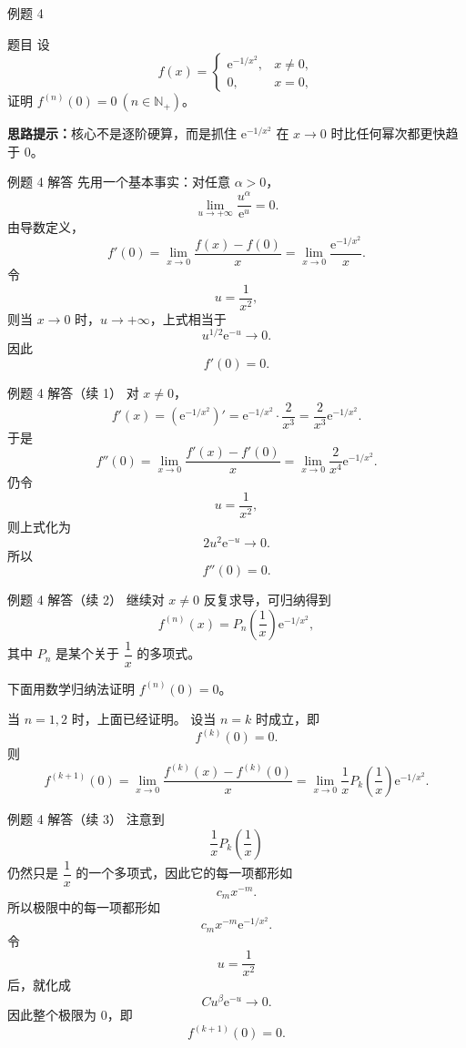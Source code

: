 ﻿\documentclass[aspectratio=169,10pt]{ctexbeamer}
\newcommand{\e}{\mathrm{e}}
\begin{document}
\begin{frame}[t]{例题 4}
\small
\begin{block}{题目}
设
\[
f(x)=
\begin{cases}
\e^{-1/x^2}, & x\ne 0,\\
0, & x=0,
\end{cases}
\]
证明 $f^{(n)}(0)=0\ (n\in\mathbb N_+)$。
\end{block}

\vspace{0.4em}
\textbf{思路提示：}核心不是逐阶硬算，而是抓住 $\e^{-1/x^2}$ 在 $x\to0$ 时比任何幂次都更快趋于 $0$。
\end{frame}

\begin{frame}[t]{例题 4 解答}
\small
先用一个基本事实：对任意 $\alpha>0$，
\[
\lim_{u\to+\infty}\frac{u^\alpha}{\e^u}=0.
\]
由导数定义，
\[
f'(0)=\lim_{x\to0}\frac{f(x)-f(0)}{x}
=\lim_{x\to0}\frac{\e^{-1/x^2}}{x}.
\]
令
\[
u=\frac1{x^2},
\]
则当 $x\to0$ 时，$u\to+\infty$，上式相当于
\[
u^{1/2}\e^{-u}\to0.
\]
因此
\[
f'(0)=0.
\]
\end{frame}

\begin{frame}[t]{例题 4 解答（续 1）}
\small
对 $x\ne0$，
\[
f'(x)=\left(\e^{-1/x^2}\right)'=\e^{-1/x^2}\cdot\frac{2}{x^3}
=\frac{2}{x^3}\e^{-1/x^2}.
\]
于是
\[
f''(0)=\lim_{x\to0}\frac{f'(x)-f'(0)}{x}
=\lim_{x\to0}\frac{2}{x^4}\e^{-1/x^2}.
\]
仍令
\[
u=\frac1{x^2},
\]
则上式化为
\[
2u^2\e^{-u}\to0.
\]
所以
\[
f''(0)=0.
\]
\end{frame}

\begin{frame}[t]{例题 4 解答（续 2）}
\small
继续对 $x\ne0$ 反复求导，可归纳得到
\[
f^{(n)}(x)=P_n\!\left(\frac1x\right)\e^{-1/x^2},
\]
其中 $P_n$ 是某个关于 $\dfrac1x$ 的多项式。

下面用数学归纳法证明 $f^{(n)}(0)=0$。

当 $n=1,2$ 时，上面已经证明。
设当 $n=k$ 时成立，即
\[
f^{(k)}(0)=0.
\]
则
\[
f^{(k+1)}(0)=\lim_{x\to0}\frac{f^{(k)}(x)-f^{(k)}(0)}{x}
=\lim_{x\to0}\frac1xP_k\!\left(\frac1x\right)\e^{-1/x^2}.
\]
\end{frame}

\begin{frame}[t]{例题 4 解答（续 3）}
\small
注意到
\[
\frac1xP_k\!\left(\frac1x\right)
\]
仍然只是 $\dfrac1x$ 的一个多项式，因此它的每一项都形如
\[
c_mx^{-m}.
\]
所以极限中的每一项都形如
\[
c_mx^{-m}\e^{-1/x^2}.
\]
令
\[
u=\frac1{x^2}
\]
后，就化成
\[
Cu^\beta\e^{-u}\to0.
\]
因此整个极限为 $0$，即
\[
f^{(k+1)}(0)=0.
\]
\end{frame}
\end{document}

